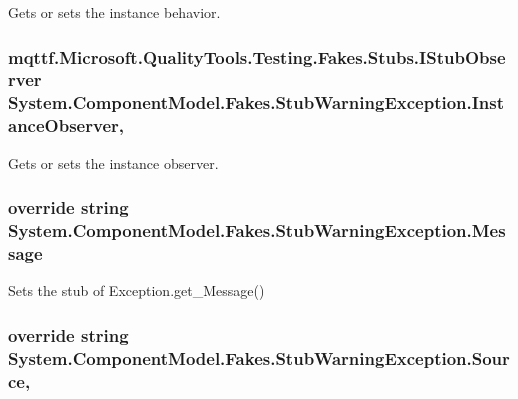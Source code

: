 Gets or sets the instance behavior.

\hypertarget{class_system_1_1_component_model_1_1_fakes_1_1_stub_warning_exception_a8bd69e29b5600b7d9c0d0ae88b8a1dac}{
\subsubsection[{Instance\-Observer}]{\setlength{\rightskip}{0pt plus 5cm}mqttf.\-Microsoft.\-Quality\-Tools.\-Testing.\-Fakes.\-Stubs.\-I\-Stub\-Observer System.\-Component\-Model.\-Fakes.\-Stub\-Warning\-Exception.\-Instance\-Observer\hspace{0.3cm}{\ttfamily [get]}, {\ttfamily [set]}}}\label{class_system_1_1_component_model_1_1_fakes_1_1_stub_warning_exception_a8bd69e29b5600b7d9c0d0ae88b8a1dac}


Gets or sets the instance observer.

\hypertarget{class_system_1_1_component_model_1_1_fakes_1_1_stub_warning_exception_a837332eb84ef3a8b9b02249e2b5911bd}{
\subsubsection[{Message}]{\setlength{\rightskip}{0pt plus 5cm}override string System.\-Component\-Model.\-Fakes.\-Stub\-Warning\-Exception.\-Message\hspace{0.3cm}{\ttfamily [get]}}}\label{class_system_1_1_component_model_1_1_fakes_1_1_stub_warning_exception_a837332eb84ef3a8b9b02249e2b5911bd}


Sets the stub of Exception.\-get\-\_\-\-Message()

\hypertarget{class_system_1_1_component_model_1_1_fakes_1_1_stub_warning_exception_a95c34d123a793dcdaa46eec33b50b8d6}{
\subsubsection[{Source}]{\setlength{\rightskip}{0pt plus 5cm}override string System.\-Component\-Model.\-Fakes.\-Stub\-Warning\-Exception.\-Source\hspace{0.3cm}{\ttfamily [get]}, {\ttfamily [set]}}}\label{class_system_1_1_component_model_1_1_fakes_1_1_stub_warning_exception_a95c34d123a793dcdaa46eec33b50b8d6}


